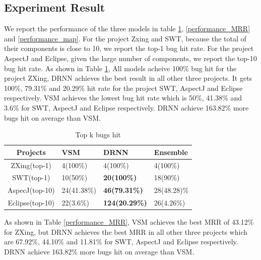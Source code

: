 \subsection{Experiment Result}

We report the performance of the three models in table \ref{performance_top_k}, \ref{performance_MRR} and \ref{performance_map}.
For the project Zxing and SWT, because the total of  their components is close to 10, we report the top-1 bug hit rate.
For the project AspectJ and Eclipse, given the large  number of components, we report the top-10 bug hit rate.
As shown in Table \ref{performance_top_k}, All models acheive 100\%  bug hit for the project ZXing, DRNN achieves the best result in all other three projects. It gets 100\%, 79.31\% and 20.29\% hit rate for the project SWT, AspectJ and Eclipse respectively. 
VSM achieves the lowest bug hit rate which is 50\%, 41.38\% and 3.6\% for SWT, AspectJ and Eclipse respectively. 
DRNN achieve 163.82\% more bugs hit on average than VSM.

 \begin{table}[h]
 	\begin{center}
 		\caption{Top k bugs hit}
 		\label{performance_top_k}
 		
 		\begin{tabular}{c|l|l|l} %
 			 \textbf{Projects} & \textbf{VSM} & \textbf{DRNN} & \textbf{Ensemble} \\
 			\hline\hline
 			ZXing(top-1)& 4(100\%)&4(100\%) &4(100\%) \\
 			
 			SWT(top-1) & 10(50\%) & \textbf{20(100\%)} &18(90\%)\\
 			
 			AspecJ(top-10) & 24(41.38\%)  & \textbf{46(79.31\%)} & 28(48.28)\%\\
 			
 			Eclipse(top-10) &22(3.6\%) & \textbf{124(20.29\%)} & 26(4.26\%)\\
 			
 		\end{tabular}
 	\end{center}
 \end{table}

As shown in Table \ref{performance_MRR}, VSM achieves the best MRR of 43.12\% for ZXing, but DRNN achieves the best MRR in all other three projects which are 67.92\%, 44.10\% and 11.81\% for SWT, AspectJ and Eclipse respectively. 
DRNN achieve 163.82\% more bugs hit on average than VSM.

